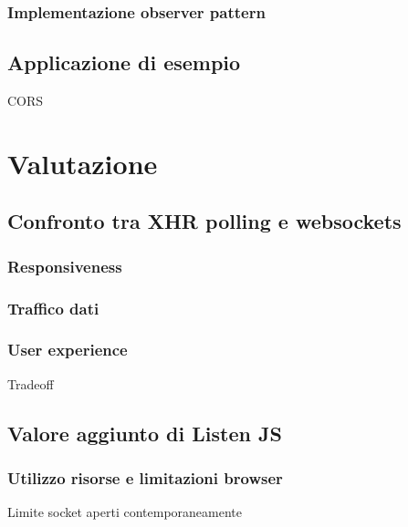 \documentclass[12pt,a4paper,openright]{report}
\begin{document}
\subsection{Implementazione observer pattern}

\section{Applicazione di esempio}\label{sec_applicazioneesempio}
CORS
\chapter{Valutazione}

\section{Confronto tra XHR polling e websockets}\label{sec_confrontopollingwebsockets}

\subsection{Responsiveness}

\subsection{Traffico dati}

\subsection{User experience}
Tradeoff

\section{Valore aggiunto di Listen JS}\label{sec_valorelistenjs}

\subsection{Utilizzo risorse e limitazioni browser}
Limite socket aperti contemporaneamente
\end{document}
